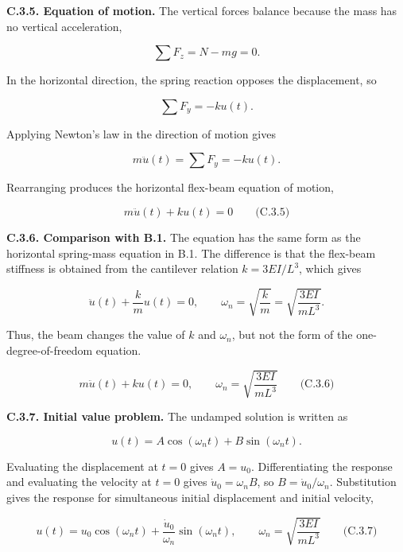 \textbf{C.3.5. Equation of motion.} The vertical forces balance because the mass has no vertical acceleration,

\[
\sum F_z=N-mg=0.
\]

In the horizontal direction, the spring reaction opposes the displacement, so

\[
\sum F_y=-ku(t).
\]

Applying Newton's law in the direction of motion gives

\[
m\ddot{u}(t)=\sum F_y=-ku(t).
\]

Rearranging produces the horizontal flex-beam equation of motion,

\[
\boxed{m\ddot{u}(t)+ku(t)=0}
\qquad\text{(C.3.5)}
\]

\textbf{C.3.6. Comparison with B.1.} The equation has the same form as the horizontal spring-mass equation in B.1. The difference is that the flex-beam stiffness is obtained from the cantilever relation \(k=3EI/L^3\), which gives

\[
\ddot{u}(t)+\frac{k}{m}u(t)=0,
\qquad
\omega_n=\sqrt{\frac{k}{m}}
 =\sqrt{\frac{3EI}{mL^3}}.
\]

Thus, the beam changes the value of \(k\) and \(\omega_n\), but not the form of the one-degree-of-freedom equation.

\[
\boxed{m\ddot{u}(t)+ku(t)=0,
\qquad \omega_n=\sqrt{\frac{3EI}{mL^3}}}
\qquad\text{(C.3.6)}
\]

\textbf{C.3.7. Initial value problem.} The undamped solution is written as

\[
u(t)=A\cos(\omega_nt)+B\sin(\omega_nt).
\]

Evaluating the displacement at \(t=0\) gives \(A=u_0\). Differentiating the response and evaluating the velocity at \(t=0\) gives \(\dot{u}_0=\omega_nB\), so \(B=\dot{u}_0/\omega_n\). Substitution gives the response for simultaneous initial displacement and initial velocity,

\[
\boxed{u(t)=u_0\cos(\omega_nt)
 +\frac{\dot{u}_0}{\omega_n}\sin(\omega_nt),
\qquad \omega_n=\sqrt{\frac{3EI}{mL^3}}}
\qquad\text{(C.3.7)}
\]

\endgroup

